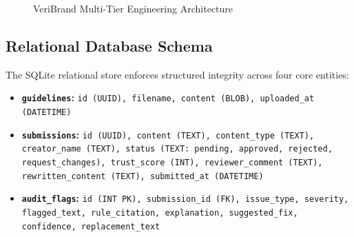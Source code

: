 \documentclass[11pt,a4paper]{article}
\begin{document}
\begin{figure}[H]
\caption{VeriBrand Multi-Tier Engineering Architecture}
\end{figure}

\subsection{Relational Database Schema}
The SQLite relational store enforces structured integrity across four core entities:
\begin{itemize}[leftmargin=1cm]
    \item \textbf{\texttt{guidelines}:} \texttt{id (UUID), filename, content (BLOB), uploaded\_at (DATETIME)}
    \item \textbf{\texttt{submissions}:} \texttt{id (UUID), content (TEXT), content\_type (TEXT), creator\_name (TEXT), status (TEXT: pending, approved, rejected, request\_changes), trust\_score (INT), reviewer\_comment (TEXT), rewritten\_content (TEXT), submitted\_at (DATETIME)}
    \item \textbf{\texttt{audit\_flags}:} \texttt{id (INT PK), submission\_id (FK), issue\_type, severity, flagged\_text, rule\_citation, explanation, suggested\_fix, confidence, replacement\_text}
\end{itemize}
\end{document}
